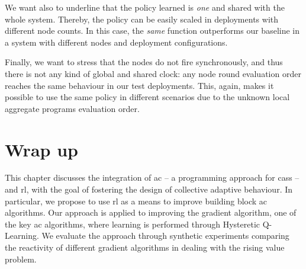 We want also to underline that the policy learned is \emph{one} and shared with the whole system.  
%
Thereby, the policy can be easily scaled in deployments with different node counts. 
%
In this case, the \emph{same} function outperforms our baseline in a system with different nodes and deployment configurations. 
%

Finally, we want to stress that the nodes do not fire synchronously, and thus there is not any kind of global and shared clock: any node round evaluation order reaches the same behaviour in our test deployments. 
%
This, again, makes it possible to use the same policy in different scenarios due to the unknown local aggregate programs evaluation order.

\section{Wrap up}\label{coordination2022:s:conc}

This chapter discusses the integration of \acl{ac} -- a programming approach for \aclp{cas} -- and \acl{rl}, with the goal of fostering the design of collective adaptive behaviour.
% 
In particular, we propose to use \ac{rl} as a means to improve building block \ac{ac} algorithms. %
%
Our approach is applied to improving the gradient algorithm, one of the key \ac{ac} algorithms, where learning is performed through Hysteretic Q-Learning.
%
We evaluate the approach through synthetic experiments comparing the reactivity of different gradient algorithms in dealing with the rising value problem.

\printbibliography